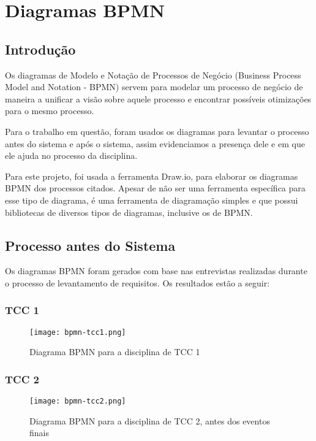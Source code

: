 \chapter{Diagramas BPMN}

\section{Introdução}

Os diagramas de Modelo e Notação de Processos de Negócio (Business Process Model and Notation - BPMN) servem para modelar um processo de negócio de maneira a unificar a visão sobre aquele processo e encontrar possíveis otimizações para o mesmo processo.

Para o trabalho em questão, foram usados os diagramas para levantar o processo antes do sistema e após o sistema, assim evidenciamos a presença dele e em que ele ajuda no processo da disciplina.

Para este projeto, foi usada a ferramenta Draw.io\cite{drawio}, para elaborar os diagramas BPMN dos processos citados. Apesar de não ser uma ferramenta específica para esse tipo de diagrama, é uma ferramenta de diagramação simples e que possui bibliotecas de diversos tipos de diagramas, inclusive os de BPMN.

\section{Processo antes do Sistema}

Os diagramas BPMN foram gerados com base nas entrevistas realizadas durante o processo de levantamento de requisitos. Os resultados estão a seguir:

\clearpage
\subsection{TCC 1}

\begin{figure}[H]
    \centering
    \texttt{[image: bpmn-tcc1.png]}
    \caption{Diagrama BPMN para a disciplina de TCC 1}
    \label{fig:bpmn-tcc1}
\end{figure}

\subsection{TCC 2}

\begin{figure}[H]
    \centering
    \texttt{[image: bpmn-tcc2.png]}
    \caption{Diagrama BPMN para a disciplina de TCC 2, antes dos eventos finais}
    \label{fig:bpmn-tcc2}
\end{figure}

